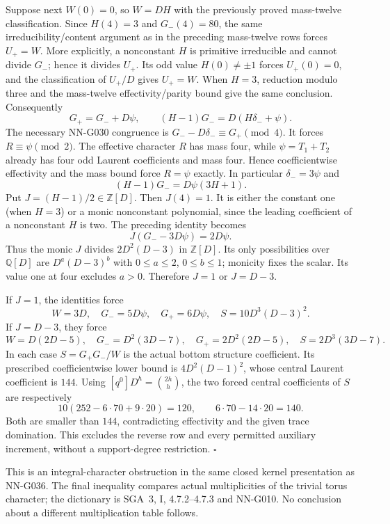 Suppose next $W(0)=0$, so $W=DH$ with the previously
proved mass-twelve classification. Since $H(4)=3$ and
$G_-(4)=80$, the same irreducibility/content argument
as in the preceding mass-twelve rows forces $U_+=W$.
More explicitly, a nonconstant $H$ is primitive irreducible
and cannot divide $G_-$; hence it divides $U_+$.
Its odd value $H(0)\ne\pm1$ forces $U_+(0)=0$,
and the classification of $U_+/D$ gives $U_+=W$.
When $H=3$, reduction modulo three and the mass-twelve
effectivity/parity bound give the same conclusion.
Consequently
\[
 G_+=G_-+D\psi,\qquad
                  (H-1)G_-=D(H\delta_-+\psi).
\]
The necessary NN-G030 congruence is
$G_--D\delta_-\equiv G_+\pmod4$.
It forces $R\equiv\psi\pmod2$.
The effective character $R$ has mass four, while
$\psi=T_1+T_2$ already has four odd Laurent coefficients
and mass four. Hence coefficientwise effectivity and
the mass bound force $R=\psi$ exactly. In particular
$\delta_-=3\psi$ and
\[
                    (H-1)G_-=D\psi(3H+1).
\]
Put $J=(H-1)/2\in\mathbb Z[D]$.
Then $J(4)=1$. It is either the constant one (when $H=3$)
or a monic nonconstant polynomial, since the leading
coefficient of a nonconstant $H$ is two.
The preceding identity becomes
\[
                    J(G_--3D\psi)=2D\psi.
\]
Thus the monic $J$ divides $2D^2(D-3)$ in $\mathbb Z[D]$.
Its only possibilities over $\mathbb Q[D]$ are
$D^a(D-3)^b$ with $0\le a\le2$, $0\le b\le1$;
monicity fixes the scalar. Its value one at four
excludes $a>0$. Therefore $J=1$ or $J=D-3$.

If $J=1$, the identities force
\[
 W=3D,\quad G_-=5D\psi,\quad G_+=6D\psi,\quad
 S=10D^3(D-3)^2.
\]
If $J=D-3$, they force
\[
 W=D(2D-5),\quad G_-=D^2(3D-7),\quad
 G_+=2D^2(2D-5),\quad S=2D^3(3D-7).
\]
In each case $S=G_+G_-/W$ is the actual bottom
structure coefficient. Its prescribed coefficientwise
lower bound is $4D^2(D-1)^2$, whose central Laurent
coefficient is $144$.
Using $[q^0]D^h=\binom{2h}{h}$, the two forced
central coefficients of $S$ are respectively
\[
 10(252-6\cdot70+9\cdot20)=120,\qquad
                    6\cdot70-14\cdot20=140.
\]
Both are smaller than $144$, contradicting effectivity
and the given trace domination. This excludes the reverse
row and every permitted auxiliary increment, without a
support-degree restriction.
\hfill$\square$

This is an integral-character obstruction in the same
closed kernel presentation as NN-G036. The final inequality
compares actual multiplicities of the trivial torus character;
the dictionary is SGA~3, I, 4.7.2--4.7.3 and NN-G010.
No conclusion about a different multiplication table follows.

